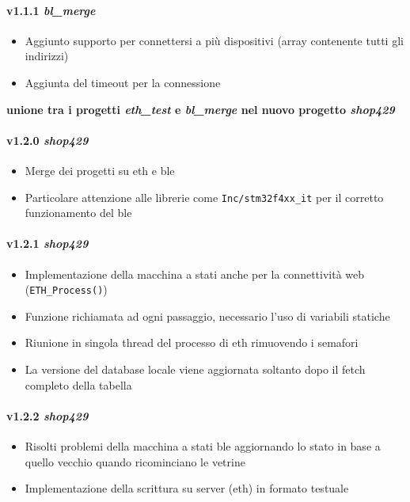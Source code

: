 \paragraph{v1.1.1 \textit{bl\_merge}}
	\begin{itemize}
		\item Aggiunto supporto per connettersi a pi\`{u} dispositivi (array contenente tutti gli indirizzi)
		\item Aggiunta del timeout per la connessione
	\end{itemize}

\textbf{unione tra i progetti \textit{eth\_test} e \textit{bl\_merge} nel nuovo progetto \textit{shop429}}

\paragraph{v1.2.0 \textit{shop429}}
	\begin{itemize}
		\item Merge dei progetti su eth e ble
		\item Particolare attenzione alle librerie come \texttt{Inc/stm32f4xx\_it} per il corretto funzionamento del ble
	\end{itemize}
\paragraph{v1.2.1 \textit{shop429}}
	\begin{itemize}
		\item Implementazione della macchina a stati anche per la connettivit\`{a} web (\texttt{ETH\_Process()})
		\item Funzione richiamata ad ogni passaggio, necessario l'uso di variabili statiche
		\item Riunione in singola thread del processo di eth rimuovendo i semafori
		\item La versione del database locale viene aggiornata soltanto dopo il fetch completo della tabella
	\end{itemize}
\paragraph{v1.2.2 \textit{shop429}}
	\begin{itemize}
		\item Risolti problemi della macchina a stati ble aggiornando lo stato in base a quello vecchio quando ricominciano le vetrine
		\item Implementazione della scrittura su server (eth) in formato testuale
	\end{itemize}
